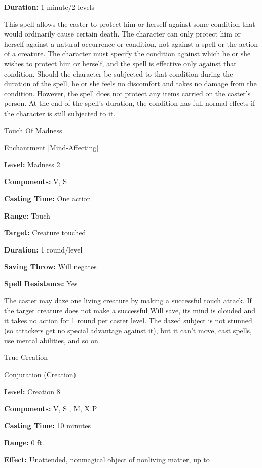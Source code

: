 \documentclass{article}
\begin{document}
\textbf{Duration:} 1 minute/2 levels

This spell allows the caster to protect him or herself against some condition that 
would ordinarily cause certain death. The character can only protect him or herself 
against a natural occurrence or condition, not against a spell or the action of 
a creature. The character must specify the condition against which he or she wishes 
to protect him or herself, and the spell is effective only against that condition. 
Should the character be subjected to that condition during the duration of the 
spell, he or she feels no discomfort and takes no damage from the condition. However, 
the spell does not protect any items carried on the caster's person. At the end 
of the spell's duration, the condition has full normal effects if the character 
is still subjected to it.

\vspace{12pt}
Touch Of Madness

Enchantment [Mind-Affecting]

\textbf{Level:} Madness 2

\textbf{Components:} V, S

\textbf{Casting Time:} One action

\textbf{Range:} Touch

\textbf{Target:} Creature touched

\textbf{Duration:} 1 round/level

\textbf{Saving Throw:} Will negates

\textbf{Spell Resistance:} Yes

The caster may daze one living creature by making a successful touch attack. If 
the target creature does not make a successful Will save, its mind is clouded and 
it takes no action for 1 round per caster level. The dazed subject is not stunned 
(so attackers get no special advantage against it), but it can't move, cast spells, 
use mental abilities, and so on.

\vspace{12pt}
True Creation

Conjuration (Creation)

\textbf{Level:} Creation 8

\textbf{Components:} V, S , M, X P

\textbf{Casting Time:} 10 minutes

\textbf{Range:} 0 ft.

\textbf{Effect:} Unattended, nonmagical object of nonliving matter, up to
\end{document}
